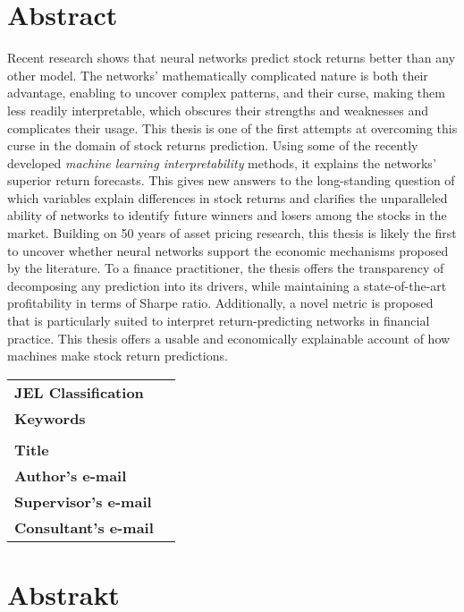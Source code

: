 \section*{Abstract}


Recent research shows that neural networks predict stock returns better than any other model. The networks' mathematically complicated nature is both their advantage, enabling to uncover complex patterns, and their curse, making them less readily interpretable, which obscures their strengths and weaknesses and complicates their usage. This thesis is one of the first attempts at overcoming this curse in the domain of stock returns prediction. Using some of the recently developed \textit{machine learning interpretability} methods, it explains the networks' superior return forecasts. This gives new answers to the long-standing question of which variables explain differences in stock returns and clarifies the unparalleled ability of networks to identify future winners and losers among the stocks in the market. Building on 50 years of asset pricing research, this thesis is likely the first to uncover whether neural networks support the economic mechanisms proposed by the literature. To a finance practitioner, the thesis offers the transparency of decomposing any prediction into its drivers, while maintaining a state-of-the-art profitability in terms of Sharpe ratio. Additionally, a novel metric is proposed that is particularly suited to interpret return-predicting networks in financial practice. This thesis offers a usable and economically explainable account of how machines make stock return predictions.

\bigskip

\begin{tabular}{lp{8.6cm}}
		\textbf{JEL Classification} & \JEL \\
		\textbf{Keywords} & \Keywords \\
 		& \\
		\textbf{Title} & \Bookname \\
 		\textbf{Author's e-mail} & \texttt{\href{mailto:\Email}{\Email}}\\
		\textbf{Supervisor's e-mail} & \texttt{\href{mailto:\EmailSup}{\EmailSup}}\\
		\textbf{Consultant's e-mail} & \texttt{\href{mailto:\EmailCon}{\EmailCon}}\\
\end{tabular}

\bigskip

\section*{Abstrakt}\label{abstract}

